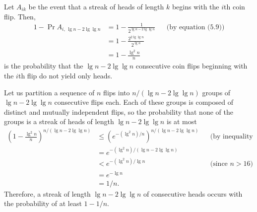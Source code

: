 \starred
{}

Let $A_{ik}$ be the event that a streak of heads of length $k$ begins with the $i$th coin flip.
Then,
\begin{align*}
    1-\Pr{A_{i,\,\lg n-2\lg\lg n}} &= 1-\frac{1}{2^{\lg n-2\lg\lg n}} && \text{(by equation (5.9))} \\[1mm]
    &= 1-\frac{2^{2\lg\lg n}}{2^{\lg n}} \\[1mm]
    &= 1-\frac{\lg^2n}{n}
\end{align*}
is the probability that the $\lg n-2\lg\lg n$ consecutive coin flips beginning with the $i$th flip do not yield only heads.

Let us partition a sequence of $n$ flips into $n/(\lg n-2\lg\lg n)$ groups of $\lg n-2\lg\lg n$ consecutive flips each.
Each of these groups is composed of distinct and mutually independent flips, so the probability that none of the groups is a streak of heads of length $\lg n-2\lg\lg n$ is at most
\begin{align*}
    \left(1-\frac{\lg^2n}{n}\right)^{n/(\lg n-2\lg\lg n)} &\le \left(e^{-(\lg^2n)/n}\right)^{n/(\lg n-2\lg\lg n)} && \text{(by inequality (3.14))} \\
    &= e^{-(\lg^2n)/(\lg n-2\lg\lg n)} \\
    &< e^{-(\lg^2n)/\lg n} && \text{(since $n>16$)} \\
    &= e^{-\lg n} \\
    &= 1/n.
\end{align*}
Therefore, a streak of length $\lg n-2\lg\lg n$ of consecutive heads occurs with the probability of at least $1-1/n$.
